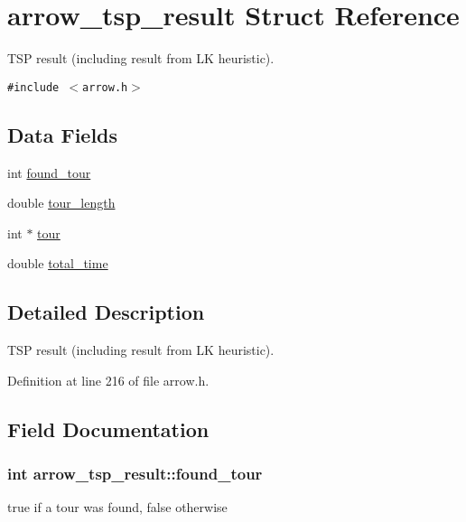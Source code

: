 \hypertarget{structarrow__tsp__result}{
\section{arrow\_\-tsp\_\-result Struct Reference}
\label{structarrow__tsp__result}
}
TSP result (including result from LK heuristic).  


{\tt \#include $<$arrow.h$>$}

\subsection*{Data Fields}
\begin{CompactItemize}
\item 
int \hyperlink{structarrow__tsp__result_b85143df6ecc70032db7411a1aa3192a}{found\_\-tour}
\item 
double \hyperlink{structarrow__tsp__result_93a335ce86270dd455185d22ea5fd4ab}{tour\_\-length}
\item 
int $\ast$ \hyperlink{structarrow__tsp__result_48433b03146d6ca3423a555ea2139d52}{tour}
\item 
double \hyperlink{structarrow__tsp__result_82ea7aa0320d932892602d34339a9276}{total\_\-time}
\end{CompactItemize}


\subsection{Detailed Description}
TSP result (including result from LK heuristic). 

Definition at line 216 of file arrow.h.

\subsection{Field Documentation}
\hypertarget{structarrow__tsp__result_b85143df6ecc70032db7411a1aa3192a}{
\subsubsection{\setlength{\rightskip}{0pt plus 5cm}int {\bf arrow\_\-tsp\_\-result::found\_\-tour}}}
\label{structarrow__tsp__result_b85143df6ecc70032db7411a1aa3192a}


true if a tour was found, false otherwise 

